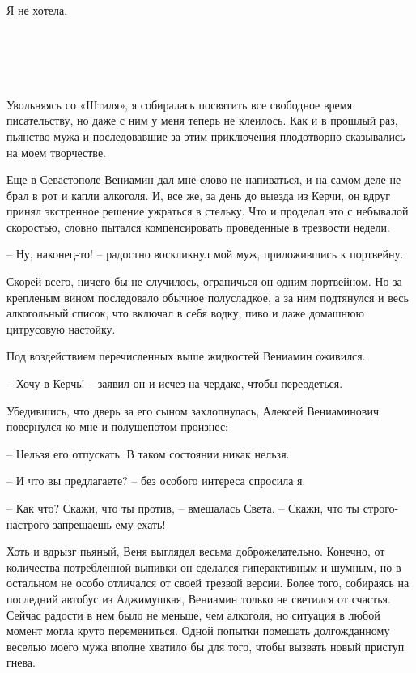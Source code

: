 \documentclass[
]{book}
\begin{document}
Я не хотела.

\hypertarget{chapter-67}{%
\chapter{~}\label{chapter-67}}

Увольняясь со «Штиля», я собиралась посвятить все свободное время писательству, но даже с ним у меня теперь не клеилось. Как и в прошлый раз, пьянство мужа и последовавшие за этим приключения плодотворно сказывались на моем творчестве.

Еще в Севастополе Вениамин дал мне слово не напиваться, и на самом деле не брал в рот и капли алкоголя. И, все же, за день до выезда из Керчи, он вдруг принял экстренное решение ужраться в стельку. Что и проделал это с небывалой скоростью, словно пытался компенсировать проведенные в трезвости недели.

-- Ну, наконец-то! -- радостно воскликнул мой муж, приложившись к портвейну.

Скорей всего, ничего бы не случилось, ограничься он одним портвейном. Но за крепленым вином последовало обычное полусладкое, а за ним подтянулся и весь алкогольный список, что включал в себя водку, пиво и даже домашнюю цитрусовую настойку.

Под воздействием перечисленных выше жидкостей Вениамин оживился.

-- Хочу в Керчь! -- заявил он и исчез на чердаке, чтобы переодеться.

Убедившись, что дверь за его сыном захлопнулась, Алексей Вениаминович повернулся ко мне и полушепотом произнес:

-- Нельзя его отпускать. В таком состоянии никак нельзя.

-- И что вы предлагаете? -- без особого интереса спросила я.

-- Как что? Скажи, что ты против, -- вмешалась Света. -- Скажи, что ты строго-настрого запрещаешь ему ехать!

Хоть и вдрызг пьяный, Веня выглядел весьма доброжелательно. Конечно, от количества потребленной выпивки он сделался гиперактивным и шумным, но в остальном не особо отличался от своей трезвой версии. Более того, собираясь на последний автобус из Аджимушкая, Вениамин только не светился от счастья. Сейчас радости в нем было не меньше, чем алкоголя, но ситуация в любой момент могла круто перемениться. Одной попытки помешать долгожданному веселью моего мужа вполне хватило бы для того, чтобы вызвать новый приступ гнева.
\end{document}
